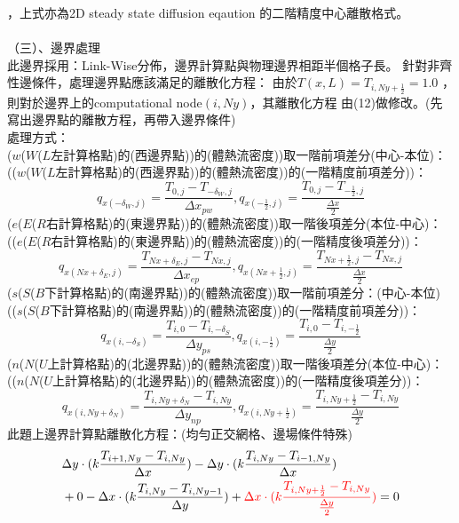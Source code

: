 \documentclass[12pt]{article}
\begin{document}
\noindent ，上式亦為2D steady state diffusion eqaution 的二階精度中心離散格式。\\
\vspace{0.7em}\\
\noindent （三）、邊界處理\\
\noindent 此邊界採用：Link-Wise分佈，邊界計算點與物理邊界相距半個格子長。
\noindent 針對非齊性邊條件，處理邊界點應該滿足的離散化方程：
\noindent 由於$T(x,L) = T_{i,Ny+\frac{1}{2}}= 1.0$ ，則對於邊界上的computational node$(i,Ny)$，其離散化方程
\noindent 由(12)做修改。(先寫出邊界點的離散方程，再帶入邊界條件)\\
\noindent 處理方式：\\
\noindent ($w$($W$($L$左計算格點)的(西邊界點))的(體熱流密度))取一階前項差分(中心-本位)：\\
\noindent (($w$($W$($L$左計算格點)的(西邊界點))的(體熱流密度))的(一階精度前項差分))：$$ q_{x(-\delta_{W},j)}=\frac{T_{0,j} - T_{-\delta_{W},j} }{\Delta x_{pw}} ,q_{x(-\frac{1}{2},j)}=\frac{T_{0,j} - T_{-\frac{1}{2},j}}{\frac{\Delta x}{2}} $$
\noindent ($e$($E$($R$右計算格點)的(東邊界點))的(體熱流密度))取一階後項差分(本位-中心)：\\
\noindent (($e$($E$($R$右計算格點)的(東邊界點))的(體熱流密度))的(一階精度後項差分))：$$ q_{x(Nx+\delta_{E},j)}=\frac{T_{Nx+\delta_{E},j} - T_{Nx,j}}{\Delta x_{ep}}, q_{x(Nx+\frac{1}{2},j)}=\frac{T_{Nx+\frac{1}{2},j} - T_{Nx,j}}{\frac{\Delta x}{2}} $$
\noindent ($s$($S$($B$下計算格點)的(南邊界點))的(體熱流密度))取一階前項差分：(中心-本位)\\
\noindent (($s$($S$($B$下計算格點)的(南邊界點))的(體熱流密度))的(一階精度前項差分))：$$ q_{x(i,-\delta_{S})}=\frac{ T_{i,0} - T_{i,-\delta_{S}}}{\Delta y_{ps}} , q_{x(i,-\frac{1}{2})}=\frac{T_{i,0} - T_{i,-\frac{1}{2}}}{\frac{\Delta y}{2}} $$
\noindent ($n$($N$($U$上計算格點)的(北邊界點))的(體熱流密度))取一階後項差分(本位-中心)：\\
\noindent (($n$($N$($U$上計算格點)的(北邊界點))的(體熱流密度))的(一階精度後項差分))：$$ q_{x(i,Ny+\delta_{N})}=\frac{T_{i,Ny+\delta_{N}} - T_{i,Ny}}{\Delta y_{np}} , q_{x(i,Ny+\frac{1}{2})}=\frac{T_{i,Ny+\frac{1}{2}} - T_{i,Ny}}{\frac{\Delta y}{2}} $$
\noindent 此題上邊界計算點離散化方程：(均勻正交網格、邊場條件特殊)
\begin{equation}
    \begin{split}
 &\Delta y  \cdot  (k \frac{T_{i+1,Ny}-T_{i,Ny}}{\Delta x})- \Delta y \cdot (k \frac{T_{i,Ny}-T_{i-1,Ny}}{\Delta x})\\
 &+0 - \Delta x \cdot (k \frac{T_{i,Ny}-T_{i,Ny-1}}{\Delta y})+ {\color{red}\Delta x\cdot( k \frac{T_{i,Ny+\frac{1}{2}}-T_{i,Ny}}{\frac{\Delta y}{2}})} = 0\\
\end{split}
\end{equation}
\end{document}
